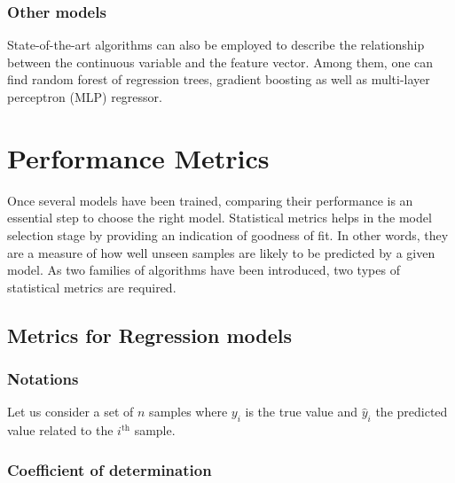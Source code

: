 \documentclass[
]{book}
\begin{document}
\hypertarget{other-models-1}{%
\subsubsection*{Other models}\label{other-models-1}}

State-of-the-art algorithms can also be employed to describe the relationship between the continuous variable and the feature vector. Among them, one can find random forest of regression trees, gradient boosting as well as multi-layer perceptron (MLP) regressor.

\hypertarget{performance-metrics}{%
\section{Performance Metrics}\label{performance-metrics}}

Once several models have been trained, comparing their performance is an essential step to choose the right model. Statistical metrics helps in the model selection stage by providing an indication of goodness of fit. In other words, they are a measure of how well unseen samples are likely to be predicted by a given model. As two families of algorithms have been introduced, two types of statistical metrics are required.

\hypertarget{metrics-for-regression-models}{%
\subsection{Metrics for Regression models}\label{metrics-for-regression-models}}

\hypertarget{notations-1}{%
\subsubsection*{Notations}\label{notations-1}}

Let us consider a set of \(n\) samples where \(y_i\) is the true value and \(\hat{y}_i\) the predicted value related to the \(i^\text{th}\) sample.

\hypertarget{coefficient-of-determination}{%
\subsubsection*{Coefficient of determination}\label{coefficient-of-determination}}
\end{document}

